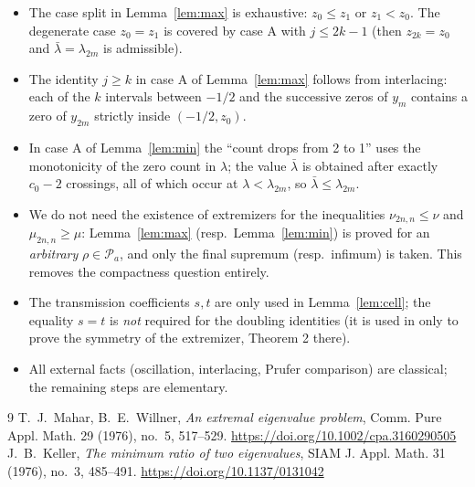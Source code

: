 ﻿\documentclass[11pt]{article}
\begin{document}
\begin{itemize}
	\item The case split in Lemma~\ref{lem:max} is exhaustive:
	$z_0\le z_1$ or $z_1<z_0$.  The degenerate case $z_0=z_1$ is covered by
	case A with $j\le 2k-1$ (then $z_{2k}=z_0$ and $\bar\lambda=\lambda_{2m}$
	is admissible).
	\item The identity $j\ge k$ in case A of Lemma~\ref{lem:max} follows
	from interlacing: each of the $k$ intervals between $-1/2$ and the
	successive zeros of $y_m$ contains a zero of $y_{2m}$ strictly inside
	$(-1/2,z_0)$.
	\item In case A of Lemma~\ref{lem:min} the ``count drops from 2 to 1''
	uses the monotonicity of the zero count in $\lambda$; the value
	$\bar\lambda$ is obtained after exactly $c_0-2$ crossings, all of which
	occur at $\lambda<\lambda_{2m}$, so $\bar\lambda\le\lambda_{2m}$.
	\item We do not need the existence of extremizers for the inequalities
	$\nu_{2n,n}\le\nu$ and $\mu_{2n,n}\ge\mu$: Lemma~\ref{lem:max}
	(resp.\ Lemma~\ref{lem:min}) is proved for an \emph{arbitrary}
	$\rho\in\mathcal P_a$, and only the final supremum (resp.\ infimum) is
	taken.  This removes the compactness question entirely.
	\item The transmission coefficients $s,t$ are only used in
	Lemma~\ref{lem:cell}; the equality $s=t$ is \emph{not} required for the
	doubling identities (it is used in \cite{mw} only to prove the
	symmetry of the extremizer, Theorem 2 there).
	\item All external facts (oscillation, interlacing, Prufer comparison)
	are classical; the remaining steps are elementary.
\end{itemize}

\begin{thebibliography}{9}
 T.~J.~Mahar, B.~E.~Willner, \emph{An extremal eigenvalue
	problem}, Comm. Pure Appl. Math. 29 (1976), no.~5, 517--529.
	\url{https://doi.org/10.1002/cpa.3160290505}
 J.~B.~Keller, \emph{The minimum ratio of two eigenvalues},
	SIAM J. Appl. Math. 31 (1976), no.~3, 485--491.
	\url{https://doi.org/10.1137/0131042}
\end{thebibliography}
\end{document}
